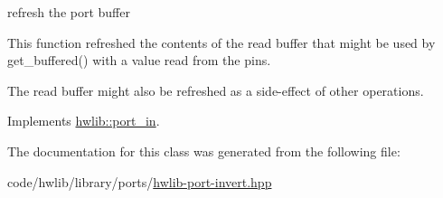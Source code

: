 refresh the port buffer

This function refreshed the contents of the read buffer that might be used by get\+\_\+buffered() with a value read from the pins.

The read buffer might also be refreshed as a side-\/effect of other operations. 

Implements \hyperlink{classhwlib_1_1port__in_a5d409eee35b766c844f7229fbe010545}{hwlib\+::port\+\_\+in}.



The documentation for this class was generated from the following file\+:\begin{DoxyCompactItemize}
\item 
code/hwlib/library/ports/\hyperlink{hwlib-port-invert_8hpp}{hwlib-\/port-\/invert.\+hpp}\end{DoxyCompactItemize}
